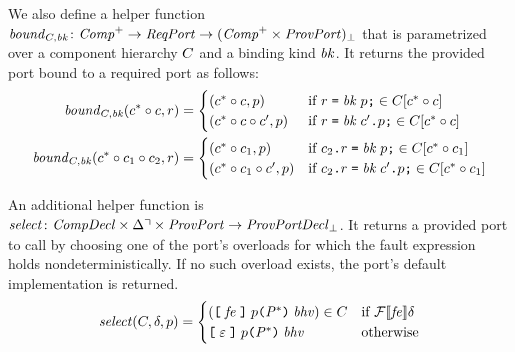 \documentclass[a4paper,10pt,english]{article}
\begin{document}
We also define a helper function $\mathit{bound}_{C, \mathit{bk}} \colon \mathit{Comp}^+ \rightarrow \mathit{ReqPort}
\rightarrow (\mathit{Comp}^+ \times \mathit{ProvPort})_\bot$ that is parametrized over a component hierarchy $C$ and a
binding kind $\mathit{bk}$. It returns the provided port bound to a required port as follows:
\begin{align*}
	\mathit{bound}_{C, \mathit{bk}}(c^* \circ c, r) &=
		\begin{cases}
			(c^* \circ c, p) & \; \, \text{if }
				r \; \texttt{=} \; \mathit{bk} \; p \texttt{;} \in
				C[c^* \circ c] \\
			(c^* \circ c \circ c', p) & \; \, \text{if }
				r \; \texttt{=} \; \mathit{bk} \; c'\texttt{.}p \texttt{;} \in
				C[c^* \circ c]
		\end{cases} \\
	\mathit{bound}_{C, \mathit{bk}}(c^* \circ c_1 \circ c_2, r) &=
		\begin{cases}
			(c^* \circ c_1, p) & \text{if }
				c_2\texttt{.}r \; \texttt{=} \; \mathit{bk} \; p \texttt{;} \in
				C[c^* \circ c_1] \\
			(c^* \circ c_1 \circ c', p) & \text{if }
				c_2\texttt{.}r \; \texttt{=} \; \mathit{bk} \; c'\texttt{.}p \texttt{;} \in
				C[c^* \circ c_1]
		\end{cases}
\end{align*}

An additional helper function is $\mathit{select} \colon \mathit{CompDecl} \times \Delta\urcorner \times \mathit{ProvPort} \rightarrow
\mathit{ProvPortDecl}_\bot$. It returns a provided port to call by choosing one of the port's overloads for which the fault
expression holds nondeterministically. If no such overload exists, the port's default implementation is returned.
\begin{equation*}
	\mathit{select}(C, \delta, p) =
	\begin{cases}
		(\texttt{[} \; \mathit{fe} \; \texttt{]} \; p \texttt{(} \mathit{P}^* \texttt{)} \; \mathit{bhv}) \in C & \text{if } \mathcal{F} \llbracket \mathit{fe} \rrbracket \delta
		\\
		\texttt{[} \; \varepsilon \; \texttt{]} \; p \texttt{(} \mathit{P}^* \texttt{)} \; \mathit{bhv} & \text{otherwise}
	\end{cases} 
\end{equation*}
\end{document}
